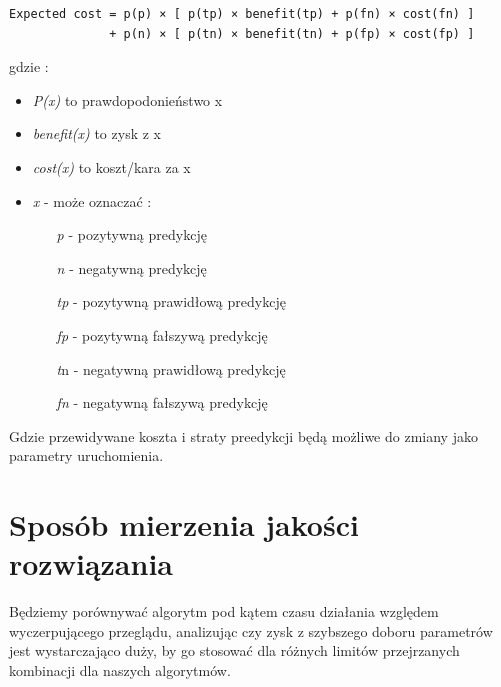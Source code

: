 \documentclass[11pt]{article}
\begin{document}
\begin{verbatim}
Expected cost = p(p) × [ p(tp) × benefit(tp) + p(fn) × cost(fn) ]
              + p(n) × [ p(tn) × benefit(tn) + p(fp) × cost(fp) ]
\end{verbatim}           
gdzie :
\begin{itemize}
	\item \textsl{P(x)} to prawdopodonieństwo x
	\item \textsl{benefit(x)} to zysk z x
	\item \textsl{cost(x)} to koszt/kara za x
	\item \textsl{x} - może oznaczać :
		\begin{itemize}
			\item[\textit{p} -] pozytywną predykcję
			\item[\textit{n} -] negatywną predykcję
			\item[\textit{tp} -] pozytywną prawidłową predykcję
			\item[\textit{fp} -] pozytywną fałszywą predykcję
			\item[\textit{t}n -] negatywną prawidłową predykcję
			\item[\textit{fn} -] negatywną fałszywą predykcję
		\end{itemize}
\end{itemize}
Gdzie przewidywane koszta i straty preedykcji będą możliwe do zmiany jako parametry uruchomienia.

\section{Sposób mierzenia jakości rozwiązania}
Będziemy porównywać algorytm pod kątem czasu działania względem wyczerpującego przeglądu, analizując czy zysk z szybszego doboru parametrów jest wystarczająco duży, by go stosować dla różnych limitów przejrzanych kombinacji dla naszych algorytmów.
\end{document}
